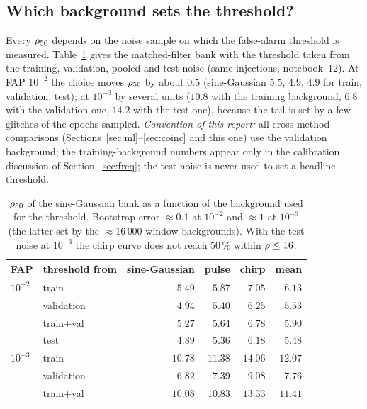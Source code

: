 \subsection{Which background sets the threshold?}\label{sec:threshconv}
Every $\rho_{50}$ depends on the noise sample on which the false-alarm threshold is measured. Table~\ref{tab:threshconv} gives the matched-filter bank with the threshold taken from the training, validation, pooled and test noise (same injections, notebook~12). At FAP $10^{-2}$ the choice moves $\rho_{50}$ by about $0.5$ (sine-Gaussian $5.5$, $4.9$, $4.9$ for train, validation, test); at $10^{-3}$ by several units ($10.8$ with the training background, $6.8$ with the validation one, $14.2$ with the test one), because the tail is set by a few glitches of the epochs sampled. \emph{Convention of this report:} all cross-method comparisons (Sections~\ref{sec:ml}--\ref{sec:coinc} and this one) use the validation background; the training-background numbers appear only in the calibration discussion of Section~\ref{sec:freq}; the test noise is never used to set a headline threshold.
\begin{table}[h]\centering\small
\begin{tabular}{llrrrr}
\toprule
FAP & threshold from & sine-Gaussian & pulse & chirp & mean\\
\midrule
$10^{-2}$ & train & $5.49$ & $5.87$ & $7.05$ & $6.13$\\
 & validation & $4.94$ & $5.40$ & $6.25$ & $5.53$\\
 & train+val & $5.27$ & $5.64$ & $6.78$ & $5.90$\\
 & test & $4.89$ & $5.36$ & $6.18$ & $5.48$\\
$10^{-3}$ & train & $10.78$ & $11.38$ & $14.06$ & $12.07$\\
 & validation & $6.82$ & $7.39$ & $9.08$ & $7.76$\\
 & train+val & $10.08$ & $10.83$ & $13.33$ & $11.41$\\
\bottomrule
\end{tabular}
\caption{$\rho_{50}$ of the sine-Gaussian bank as a function of the background used for the threshold. Bootstrap error $\approx0.1$ at $10^{-2}$ and $\approx1$ at $10^{-3}$ (the latter set by the $\approx16\,000$-window backgrounds). With the test noise at $10^{-3}$ the chirp curve does not reach $50\,\%$ within $\rho\le16$.}\label{tab:threshconv}
\end{table}


